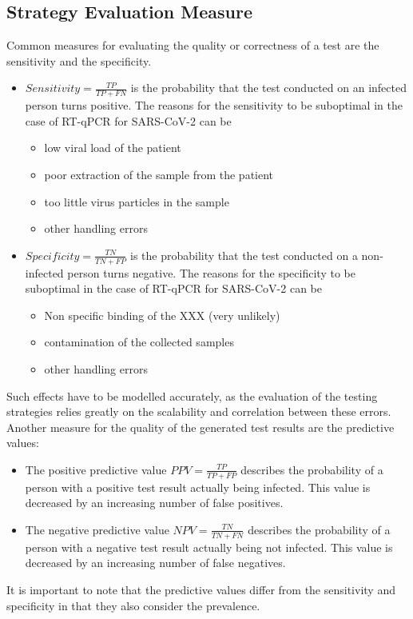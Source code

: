\documentclass[fleqn,10pt]{wlscirep}
\begin{document}
	\subsection{Strategy Evaluation Measure}
	Common measures for evaluating the quality or correctness of a test are the sensitivity and the specificity.
	\begin{itemize}
		\item $Sensitivity = \frac{TP}{TP+FN}$ is the probability that the test conducted on an infected person turns positive. The reasons for the sensitivity to be suboptimal in the case of RT-qPCR for SARS-CoV-2 can be
		\begin{itemize}
			\item{low viral load of the patient}
			\item{poor extraction of the sample from the patient}
			\item {too little virus particles in the sample}
			\item {other handling errors}
		\end{itemize}
		\item $Specificity = \frac{TN}{TN+FP}$ is the probability that the test conducted on a non-infected person turns negative. The reasons for the specificity to be suboptimal in the case of RT-qPCR for SARS-CoV-2 can be
		\begin{itemize}
			\item Non specific binding of the XXX (very unlikely)
			\item contamination of the collected samples
			\item other handling errors
			
		\end{itemize}
	\end{itemize}
	Such effects have to be modelled accurately, as the evaluation of the testing strategies relies greatly on the scalability and correlation between these errors.\\
	
	Another measure for the quality of the generated test results are the predictive values:
	\begin{itemize}
		\item The positive predictive value  $PPV = \frac{TP}{TP+FP}$ describes the probability of a person with a positive test result actually being infected. This value is decreased by an increasing number of false positives.
		\item The negative predictive value  $NPV = \frac{TN}{TN+FN}$ describes the probability of a person with a negative test result actually being not infected. This value is decreased by an increasing number of false negatives.
	\end{itemize}
	It is important to note that the predictive values differ from the sensitivity and specificity in that they also consider the prevalence.\\
	
\end{document}

